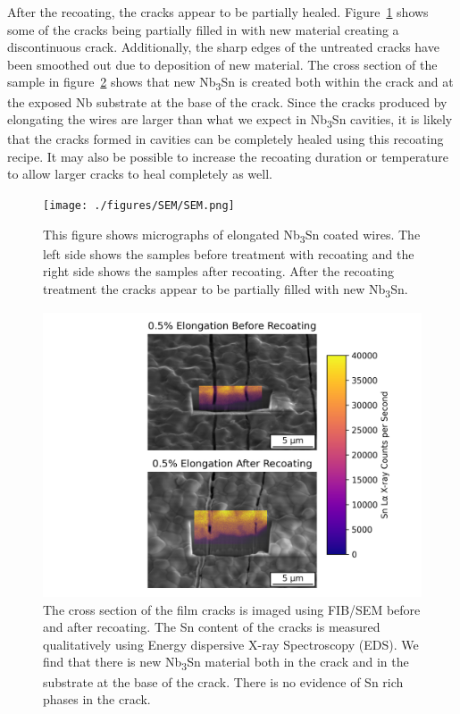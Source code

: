 After the recoating, the cracks appear to be partially healed. Figure~\ref{fig:SEM} shows some of the cracks being partially filled in with new material creating a discontinuous crack. Additionally, the sharp edges of the untreated cracks have been smoothed out due to deposition of new material. The cross section of the sample in figure~\ref{fig:EDS} shows that new Nb\textsubscript{3}Sn is created both within the crack and at the exposed Nb substrate at the base of the crack. Since the cracks produced by elongating the wires are larger than what we expect in Nb\textsubscript{3}Sn cavities, it is likely that the cracks formed in cavities can be completely healed using this recoating recipe. It may also be possible to increase the recoating duration or temperature to allow larger cracks to heal completely as well.

\begin{figure}
    
    \texttt{[image: ./figures/SEM/SEM.png]}
    \caption{This figure shows micrographs of elongated Nb\textsubscript{3}Sn coated wires. The left side shows the samples before treatment with recoating and the right side shows the samples after recoating. After the recoating treatment the cracks appear to be partially filled with new Nb\textsubscript{3}Sn.}
    \label{fig:SEM}
\end{figure}

\begin{figure}
    
    \includegraphics[]{./figures/EDS/EDS.png}
    \caption{The cross section of the film cracks is imaged using FIB/SEM before and after recoating. The Sn content of the cracks is measured qualitatively using Energy dispersive X-ray Spectroscopy (EDS). We find that there is new Nb\textsubscript{3}Sn material both in the crack and in the substrate at the base of the crack. There is no evidence of Sn rich phases in the crack.}
    \label{fig:EDS}
\end{figure}


